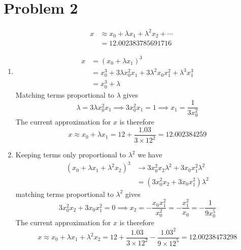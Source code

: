 \documentclass[12pt]{article}
\begin{document}
\section*{Problem 2}
\begin{align*}
    x &\approx x_0 + \lambda x_1 + \lambda^2 x_2 + \cdots\\
    &= 12.002383785691716
\end{align*}  
\begin{enumerate}[label=(\alph*)]
    \item 
    \begin{align*}
        x &= (x_0 + \lambda x_1)^3 \\
        &= x_0^3 + 3\lambda x_0^2x_1 + 3\lambda^2x_0x_1^2 + \lambda^3 x_1^3 \\
        &= x_0^3 + \lambda
    \end{align*}
    Matching terms proportional to $\lambda$ gives
    \[ \lambda = 3\lambda x_0^2x_1 \implies 3x_0^2x_1 = 1 \implies x_1 = \frac{1}{3x_0^2} \]
    The current approximation for $x$ is therefore
    \[ x \approx x_0 + \lambda x_1 = 12 + \frac{1.03}{3\times12^2} = 12.002384\overline{259} \]

    \item Keeping terms only proportional to $\lambda^2$ we have
    \begin{align*}
        (x_0 + \lambda x_1 + \lambda^2 x_2)^3 &\to 3x_0^2x_2\lambda^2 + 3x_0x_1^2\lambda^2 \\
        &= (3x_0^2x_2 + 3x_0x_1^2) \lambda^2
    \end{align*}
    matching terms proportional to $\lambda^2$ gives
    \[ 3x_0^2x_2 + 3x_0x_1^2 = 0 \implies x_2 = -\frac{x_0x_1^2}{x_0^2} = -\frac{x_1^2}{x_0} = -\frac{1}{9x_0^5} \]
    The current approximation for $x$ is therefore
    \[ x \approx x_0 + \lambda x_1 + \lambda^2 x_2 = 12 + \frac{1.03}{3\times12^2} - \frac{1.03^2}{9\times12^5} = 12.00238473298 \]
\end{enumerate}
\end{document}
